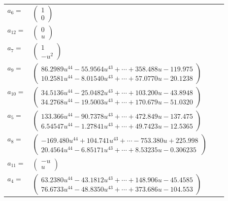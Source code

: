 \documentclass[1p]{elsarticle_modified}
\theoremstyle{definition}
\begin{document}
\begin{tabular}{m{7pt} m{180pt} m{7pt} m{180pt} }
\flushright $a_{6}=$&$\begin{pmatrix}1\\0\end{pmatrix}$ \\
\flushright $a_{12}=$&$\begin{pmatrix}0\\u\end{pmatrix}$ \\
\flushright $a_{7}=$&$\begin{pmatrix}1\\- u^2\end{pmatrix}$ \\
\flushright $a_{9}=$&$\begin{pmatrix}86.2989 u^{44}-55.9564 u^{43}+\cdots+358.488 u-119.975\\10.2581 u^{44}-8.01540 u^{43}+\cdots+57.0770 u-20.1238\end{pmatrix}$ \\
\flushright $a_{10}=$&$\begin{pmatrix}34.5136 u^{44}-25.0482 u^{43}+\cdots+103.200 u-43.8948\\34.2768 u^{44}-19.5003 u^{43}+\cdots+170.679 u-51.0320\end{pmatrix}$ \\
\flushright $a_{5}=$&$\begin{pmatrix}133.366 u^{44}-90.7378 u^{43}+\cdots+472.849 u-137.475\\6.54547 u^{44}-1.27841 u^{43}+\cdots+49.7423 u-12.5365\end{pmatrix}$ \\
\flushright $a_{8}=$&$\begin{pmatrix}-169.480 u^{44}+104.741 u^{43}+\cdots-753.380 u+225.998\\20.4564 u^{44}-6.85171 u^{43}+\cdots+8.53235 u-0.306235\end{pmatrix}$ \\
\flushright $a_{11}=$&$\begin{pmatrix}- u\\u\end{pmatrix}$ \\
\flushright $a_{4}=$&$\begin{pmatrix}63.2380 u^{44}-43.1812 u^{43}+\cdots+148.906 u-45.4585\\76.6733 u^{44}-48.8350 u^{43}+\cdots+373.686 u-104.553\end{pmatrix}$ \\

\end{tabular}
\end{document}
